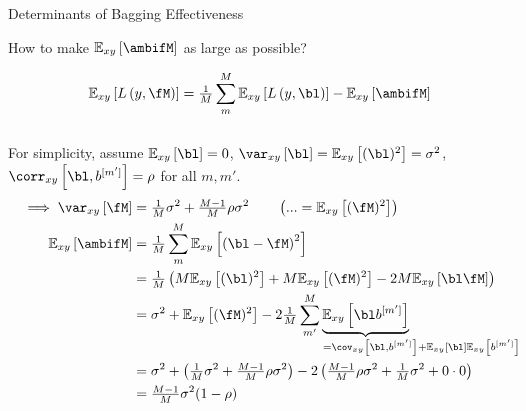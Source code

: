 \documentclass[11pt,compress,t,notes=noshow, xcolor=table]{beamer}
\begin{document}
\begin{vbframe}{Determinants of Bagging Effectiveness}

{\small How to make $\Exy\left[\ambifM\right]$ as large as possible?}
\begin{scriptsize}

$$\Exy\left[L\left(y, \fM \right)\right] = \tfrac{1}{M}\sum^M_{m} \Exy\left[L\left(y, \bl \right)\right] - \Exy\left[\ambifM\right]$$ \\
{\small For simplicity, assume $\Exy\left[\bl\right] = 0$, $\var_{xy}\left[\bl\right] = \Exy\left[(\bl)^2\right] = \sigma^2$, $\corr_{xy}\left[\bl, b^{[m']}\right] = \rho$ for all $m, m'$.}
\begin{align*}
\implies 
\var_{xy}\left[\fM\right] &= \tfrac{1}{M} \sigma^2 +  \tfrac{M-1}{M} \rho \sigma^2 \qquad\left(... = \Exy\left[(\fM)^2\right]\right)\\
 \Exy\left[\ambifM\right] &= \tfrac{1}{M}\sum^M_{m} \Exy\left[\left(\bl- \fM\right)^2\right]\\
 & = \tfrac{1}{M}\left(M \Exy\left[(\bl)^2\right] + M \Exy\left[(\fM)^2\right] - 
     2 M \Exy\left[\bl\fM\right]\right) \\
  & = \sigma^2  + \Exy\left[(\fM)^2\right] - 2 \tfrac{1}{M}\sum^M_{m'} \underbrace{\Exy\left[\bl b^{[m']} \right]}_{\mathclap{\qquad\qquad\qquad\qquad= \cov_{xy}\left[\bl, b^{[m']} \right] + \Exy\left[\bl\right]\Exy\left[b^{[m']}\right]}} \\
  &=  \sigma^2  + \left(\tfrac{1}{M} \sigma^2 +   \tfrac{M-1}{M} \rho \sigma^2\right) - 2\left(\tfrac{M-1}{M} \rho\sigma^2 + \tfrac{1}{M}\sigma^2 + 0 \cdot 0 \right)\\
  &= \tfrac{M-1}{M} \sigma^2 (1-\rho)
\end{align*}
\end{scriptsize}


\end{vbframe}
\end{document}
